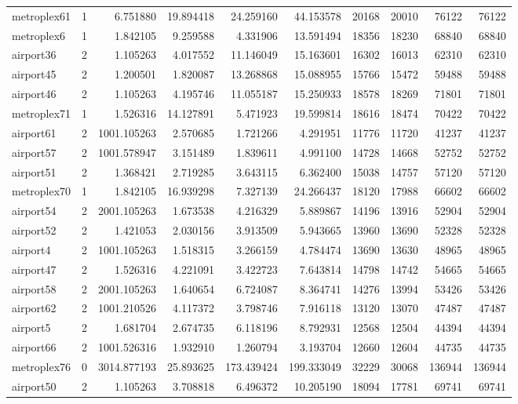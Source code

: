 \begin{longtable}{|l|r|r|r|r|r|r|r|r|r|}
metroplex61 & 1 & 6.751880 & 19.894418 & 24.259160 & 44.153578 & 20168 & 20010 & 76122 & 76122 \\
metroplex6 & 1 & 1.842105 & 9.259588 & 4.331906 & 13.591494 & 18356 & 18230 & 68840 & 68840 \\
airport36 & 2 & 1.105263 & 4.017552 & 11.146049 & 15.163601 & 16302 & 16013 & 62310 & 62310 \\
airport45 & 2 & 1.200501 & 1.820087 & 13.268868 & 15.088955 & 15766 & 15472 & 59488 & 59488 \\
airport46 & 2 & 1.105263 & 4.195746 & 11.055187 & 15.250933 & 18578 & 18269 & 71801 & 71801 \\
metroplex71 & 1 & 1.526316 & 14.127891 & 5.471923 & 19.599814 & 18616 & 18474 & 70422 & 70422 \\
airport61 & 2 & 1001.105263 & 2.570685 & 1.721266 & 4.291951 & 11776 & 11720 & 41237 & 41237 \\
airport57 & 2 & 1001.578947 & 3.151489 & 1.839611 & 4.991100 & 14728 & 14668 & 52752 & 52752 \\
airport51 & 2 & 1.368421 & 2.719285 & 3.643115 & 6.362400 & 15038 & 14757 & 57120 & 57120 \\
metroplex70 & 1 & 1.842105 & 16.939298 & 7.327139 & 24.266437 & 18120 & 17988 & 66602 & 66602 \\
airport54 & 2 & 2001.105263 & 1.673538 & 4.216329 & 5.889867 & 14196 & 13916 & 52904 & 52904 \\
airport52 & 2 & 1.421053 & 2.030156 & 3.913509 & 5.943665 & 13960 & 13690 & 52328 & 52328 \\
airport4 & 2 & 1001.105263 & 1.518315 & 3.266159 & 4.784474 & 13690 & 13630 & 48965 & 48965 \\
airport47 & 2 & 1.526316 & 4.221091 & 3.422723 & 7.643814 & 14798 & 14742 & 54665 & 54665 \\
airport58 & 2 & 2001.105263 & 1.640654 & 6.724087 & 8.364741 & 14276 & 13994 & 53426 & 53426 \\
airport62 & 2 & 1001.210526 & 4.117372 & 3.798746 & 7.916118 & 13120 & 13070 & 47487 & 47487 \\
airport5 & 2 & 1.681704 & 2.674735 & 6.118196 & 8.792931 & 12568 & 12504 & 44394 & 44394 \\
airport66 & 2 & 1001.526316 & 1.932910 & 1.260794 & 3.193704 & 12660 & 12604 & 44735 & 44735 \\
metroplex76 & 0 & 3014.877193 & 25.893625 & 173.439424 & 199.333049 & 32229 & 30068 & 136944 & 136944 \\
airport50 & 2 & 1.105263 & 3.708818 & 6.496372 & 10.205190 & 18094 & 17781 & 69741 & 69741 \\

\end{longtable}
